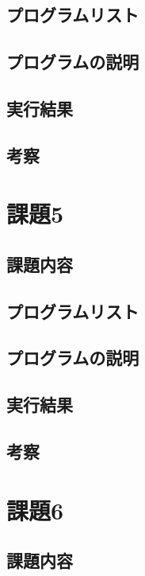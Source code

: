 \documentclass[a4j,titlepage]{jsarticle}
\begin{document}
\subsection{プログラムリスト}

\subsection{プログラムの説明}

\subsection{実行結果}

\subsection{考察}


\section{課題5}
\subsection{課題内容}

\subsection{プログラムリスト}

\subsection{プログラムの説明}

\subsection{実行結果}

\subsection{考察}


\section{課題6}
\subsection{課題内容}
\end{document}
